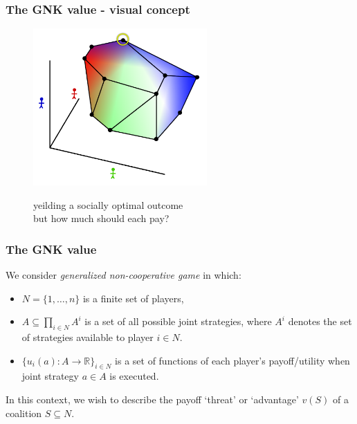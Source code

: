 \documentclass{beamer}
\begin{document}
\begin{frame} \frametitle{The GNK value - visual concept} \begin{figure} \begin{center} \includegraphics[height=6cm]{figs/pp9} \end{center} yeilding a socially optimal outcome \\ but how much should each pay? \end{figure} \end{frame}



\begin{frame}
\frametitle{The GNK value}
We consider \textit{generalized non-cooperative game} in which:
\begin{itemize}
\item	$N=\{1,\dots,n\}$ is a finite set of players,
\item	$A\subseteq \prod_{i\in N}A^i$ is a set of all possible joint strategies, where $A^i$ denotes the set of strategies available to player $i\in N$.
\item	$\{u_i(a) : A\rightarrow \mathbb{R}\}_{i\in N}$ is a set of functions of each player's payoff/utility when joint strategy $a\in A$ is executed.
\end{itemize}

In this context, we wish to describe the payoff `threat' or `advantage' $v(S)$ of a coalition $S\subseteq N$.
\end{frame}
\end{document}
